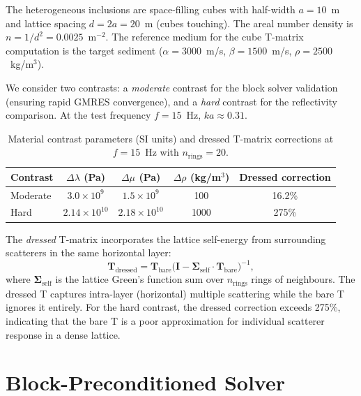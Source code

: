 \documentclass[11pt,a4paper]{article}
\theoremstyle{plain}
\theoremstyle{remark}
\begin{document}
The heterogeneous inclusions are space-filling cubes with half-width
$a = 10$~m and lattice spacing $d = 2a = 20$~m (cubes touching).  The
areal number density is $n = 1/d^2 = 0.0025$~m$^{-2}$.  The reference
medium for the cube T-matrix computation is the target sediment
($\alpha = 3000$~m/s, $\beta = 1500$~m/s, $\rho = 2500$~kg/m$^3$).

We consider two contrasts: a \emph{moderate} contrast for the block
solver validation (ensuring rapid GMRES convergence), and a \emph{hard}
contrast for the reflectivity comparison.  At the test frequency
$f = 15$~Hz, $ka \approx 0.31$.

\begin{table}[ht]
\centering
\renewcommand{\arraystretch}{1.2}
\caption{Material contrast parameters (SI units) and dressed T-matrix
corrections at $f = 15$~Hz with $n_{\mathrm{rings}} = 20$.}
\label{tab:contrast}
\begin{tabular}{lcccc}
  \toprule
  \textbf{Contrast} & $\Delta\lambda$ (Pa) & $\Delta\mu$ (Pa)
    & $\Delta\rho$ (kg/m$^3$) & Dressed correction \\
  \midrule
  Moderate & $3.0 \times 10^9$  & $1.5 \times 10^9$  & 100  & 16.2\% \\
  Hard     & $2.14 \times 10^{10}$ & $2.18 \times 10^{10}$ & 1000 & 275\% \\
  \bottomrule
\end{tabular}
\end{table}

The \emph{dressed} T-matrix incorporates the lattice self-energy from
surrounding scatterers in the same horizontal layer:
\begin{equation}\label{eq:dressed-T}
  \mathbf{T}_{\mathrm{dressed}}
  = \mathbf{T}_{\mathrm{bare}}
    \bigl(\mathbf{I}
    - \mathbf{\Sigma}_{\mathrm{self}} \cdot
    \mathbf{T}_{\mathrm{bare}}\bigr)^{-1},
\end{equation}
where $\mathbf{\Sigma}_{\mathrm{self}}$ is the lattice Green's function
sum over $n_{\mathrm{rings}}$ rings of neighbours.  The dressed T
captures intra-layer (horizontal) multiple scattering while the bare T
ignores it entirely.  For the hard contrast, the dressed correction
exceeds 275\%, indicating that the bare T is a poor approximation for
individual scatterer response in a dense lattice.

\section{Block-Preconditioned Solver}\label{sec:solver}
\end{document}
